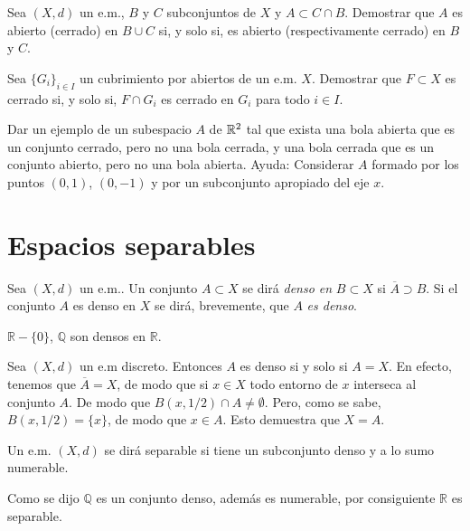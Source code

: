 \begin{ejercicio}{} Sea $(X,d)$ un e.m., $B$ y $C$ subconjuntos de
$X$ y $A\subset C\cap B$. Demostrar que $A$ es abierto (cerrado)
en $B\cup C$ si, y solo si, es abierto (respectivamente cerrado)
en $B$ y $C$.
\end{ejercicio}

\begin{ejercicio}{} Sea $\{G_i\}_{i\in I}$ un cubrimiento por abiertos de un e.m.
$X$. Demostrar que $F\subset X$ es cerrado si, y solo si, $F\cap
G_i$ es cerrado en $G_i$ para todo $i\in I$.
\end{ejercicio}

\begin{ejercicio}{} Dar un ejemplo de un subespacio $A$ de $\mathbb{R}^2$
tal que exista una bola abierta que es un conjunto cerrado, pero
no una bola cerrada, y una bola cerrada que es un conjunto
abierto, pero no una bola abierta. Ayuda: Considerar $A$ formado
por los puntos $(0,1)$, $(0,-1)$ y por un subconjunto apropiado
del eje $x$.
\end{ejercicio}



\section{Espacios separables}
\begin{definicion}{} Sea $(X,d)$ un e.m.. Un conjunto $A\subset X$
se dirá \emph{denso en }$B\subset X$ si $\overline{A}\supset B$.
Si el conjunto $A$ es denso en $X$ se dirá, brevemente, que $A$
\emph{es denso}.
\end{definicion}
\begin{ejemplo}{} $\mathbb{R}-\{0\}$, $\mathbb{Q}$ son densos en $\mathbb{R}$.
\end{ejemplo}
\begin{ejemplo}{} Sea $(X,d)$ un e.m discreto. Entonces $A$ es denso
si y solo si $A=X$. En efecto, tenemos que $\overline{A}=X$, de
modo que si $x\in X$  todo entorno de $x$ interseca al conjunto
$A$. De modo que  $B(x,1/2)\cap A\neq\emptyset$. Pero, como se
sabe, $B(x,1/2)=\{x\}$, de modo que $x\in A$. Esto demuestra que
$X=A$.
\end{ejemplo}

\begin{definicion}{} Un e.m. $(X,d)$ se dirá separable si tiene un
subconjunto denso y a lo sumo numerable.
\end{definicion}

\begin{ejemplo}{} Como se dijo $\mathbb{Q}$ es un conjunto denso,
además es numerable, por consiguiente $\mathbb{R}$ es separable.
\end{ejemplo}


